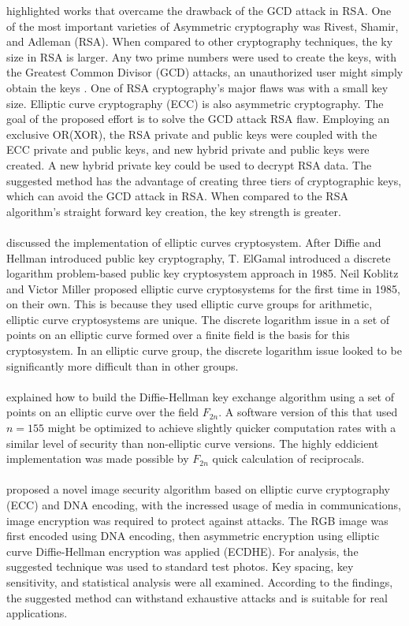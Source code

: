 \cite{Vidhya2019} highlighted works that overcame the drawback of the GCD attack in RSA. One of the most important varieties of Asymmetric cryptography was Rivest, Shamir, and Adleman (RSA). When compared to other cryptography techniques, the ky size in RSA is larger. Any two prime numbers were used to create the keys, with the Greatest Common Divisor (GCD) attacks, an unauthorized user might simply obtain the keys . One of RSA cryptography's major flaws was with a small key size. Elliptic curve cryptography (ECC) is also asymmetric cryptography. The goal of the proposed effort is to solve the GCD attack RSA flaw. Employing an exclusive OR(XOR), the RSA private and public keys were coupled with the ECC private and public keys, and new hybrid private and public keys were created. A new hybrid private key could be used to decrypt RSA data. The suggested method has the advantage of creating three tiers of cryptographic keys, which can avoid the GCD attack in RSA. When compared to the RSA algorithm's straight forward key creation, the key strength is greater.\\\\
\cite{Sutikno1998} discussed  the implementation of elliptic curves cryptosystem. After Diffie and Hellman introduced public key cryptography, T. ElGamal introduced a discrete logarithm problem-based public key cryptosystem approach in 1985. Neil Koblitz and Victor Miller proposed elliptic curve cryptosystems for the first time in 1985, on their own. This is because they used elliptic curve groups for arithmetic, elliptic curve cryptosystems are unique. The discrete logarithm issue in a set of points on an elliptic curve formed over a finite field is the basis for this cryptosystem. In an elliptic curve group, the discrete logarithm issue looked to be significantly more difficult than in other groups.\\\\
\cite{Schroeppel1995} explained how to build the Diffie-Hellman key exchange algorithm using a set of points on an elliptic curve over the field $F_{2n}$. A software version of this that used $n = 155$ might be optimized to achieve slightly quicker computation rates with a similar level of security than non-elliptic curve versions. The highly eddicient implementation was made possible by $F_{2n}$ quick calculation of reciprocals.\\\\
\cite{Kumar2016} proposed a novel image security algorithm based on elliptic curve cryptography (ECC) and DNA encoding, with the incressed usage of media in communications, image encryption was required to protect against attacks. The RGB image was first encoded using DNA encoding, then asymmetric encryption using elliptic curve Diffie-Hellman encryption  was applied (ECDHE). For analysis, the suggested technique was used to standard test photos. Key spacing, key sensitivity, and statistical analysis were all examined. According to the findings, the suggested method can withstand exhaustive attacks and is suitable for real applications.\\\\
